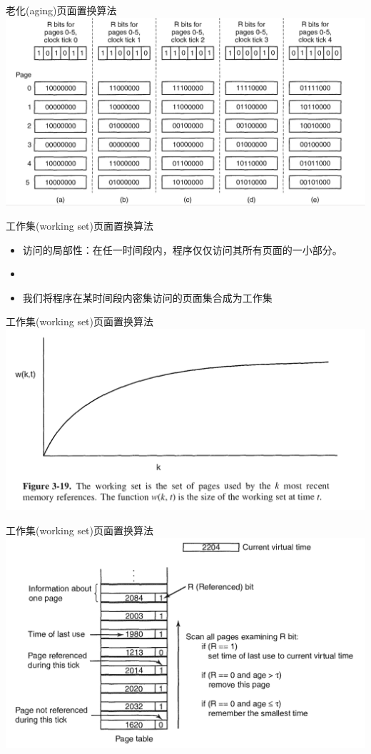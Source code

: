 \documentclass[xcolor=svgnames]{beamer}
\begin{document}
\begin{CJK*}{UTF8}{gbsn}
\begin{frame}{老化(aging)页面置换算法}
\includegraphics[width=1.0\textwidth]{aging.png}
\end{frame}

\begin{frame}{工作集(working set)页面置换算法}
\begin{itemize}
\item 访问的\alert{局部性}：在任一时间段内，程序仅仅访问其所有页面的一小部分。
\item[]
\item 我们将程序在某时间段内密集访问的页面集合成为\alert{工作集}
\end{itemize}
\end{frame}

\begin{frame}{工作集(working set)页面置换算法}
\includegraphics[width=1.0\textwidth]{ws0.png}
\end{frame}

\begin{frame}{工作集(working set)页面置换算法}
\includegraphics[width=1.0\textwidth]{ws.png}
\end{frame}


\end{CJK*}
\end{document}
